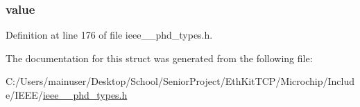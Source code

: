 \subsubsection[{value}]{ value}\label{struct___bat_measure_ac7ab47e6d1990917b05d22ecaddb0a00}


Definition at line 176 of file ieee\+\_\+\_\+phd\+\_\+types.\+h.



The documentation for this struct was generated from the following file\+:\begin{DoxyCompactItemize}
\item 
C\+:/\+Users/mainuser/\+Desktop/\+School/\+Senior\+Project/\+Eth\+Kit\+T\+C\+P/\+Microchip/\+Include/\+I\+E\+E\+E/\hyperlink{ieee__11073__phd__types_8h}{ieee\+\_\+\_\+phd\+\_\+types.\+h}\end{DoxyCompactItemize}
